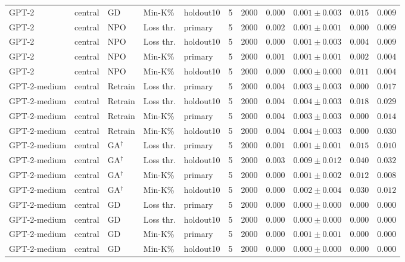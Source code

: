 \begin{table}[t]
\begin{tabular*}{\textwidth}{@{\extracolsep{\fill}}lllllcccccc@{}}
GPT-2 & central & GD & Min-K\% & holdout10 & 5 & 2000 & $0.000$ & $0.001 \pm 0.003$ & $0.015$ & $0.009$ \\
GPT-2 & central & NPO & Loss thr. & primary & 5 & 2000 & $0.002$ & $0.001 \pm 0.001$ & $0.000$ & $0.009$ \\
GPT-2 & central & NPO & Loss thr. & holdout10 & 5 & 2000 & $0.000$ & $0.001 \pm 0.003$ & $0.004$ & $0.009$ \\
GPT-2 & central & NPO & Min-K\% & primary & 5 & 2000 & $0.001$ & $0.001 \pm 0.001$ & $0.002$ & $0.004$ \\
GPT-2 & central & NPO & Min-K\% & holdout10 & 5 & 2000 & $0.000$ & $0.000 \pm 0.000$ & $0.011$ & $0.004$ \\
GPT-2-medium & central & Retrain & Loss thr. & primary & 5 & 2000 & $0.004$ & $0.003 \pm 0.003$ & $0.000$ & $0.017$ \\
GPT-2-medium & central & Retrain & Loss thr. & holdout10 & 5 & 2000 & $0.004$ & $0.004 \pm 0.003$ & $0.018$ & $0.029$ \\
GPT-2-medium & central & Retrain & Min-K\% & primary & 5 & 2000 & $0.004$ & $0.003 \pm 0.003$ & $0.000$ & $0.014$ \\
GPT-2-medium & central & Retrain & Min-K\% & holdout10 & 5 & 2000 & $0.004$ & $0.004 \pm 0.003$ & $0.000$ & $0.030$ \\
GPT-2-medium & central & GA$^{\dagger}$ & Loss thr. & primary & 5 & 2000 & $0.001$ & $0.001 \pm 0.001$ & $0.015$ & $0.010$ \\
GPT-2-medium & central & GA$^{\dagger}$ & Loss thr. & holdout10 & 5 & 2000 & $0.003$ & $0.009 \pm 0.012$ & $0.040$ & $0.032$ \\
GPT-2-medium & central & GA$^{\dagger}$ & Min-K\% & primary & 5 & 2000 & $0.000$ & $0.001 \pm 0.002$ & $0.012$ & $0.008$ \\
GPT-2-medium & central & GA$^{\dagger}$ & Min-K\% & holdout10 & 5 & 2000 & $0.000$ & $0.002 \pm 0.004$ & $0.030$ & $0.012$ \\
GPT-2-medium & central & GD & Loss thr. & primary & 5 & 2000 & $0.000$ & $0.000 \pm 0.000$ & $0.000$ & $0.000$ \\
GPT-2-medium & central & GD & Loss thr. & holdout10 & 5 & 2000 & $0.000$ & $0.000 \pm 0.000$ & $0.000$ & $0.000$ \\
GPT-2-medium & central & GD & Min-K\% & primary & 5 & 2000 & $0.000$ & $0.001 \pm 0.001$ & $0.000$ & $0.000$ \\
GPT-2-medium & central & GD & Min-K\% & holdout10 & 5 & 2000 & $0.000$ & $0.000 \pm 0.000$ & $0.000$ & $0.000$ \\

\end{tabular*}
\end{table}
